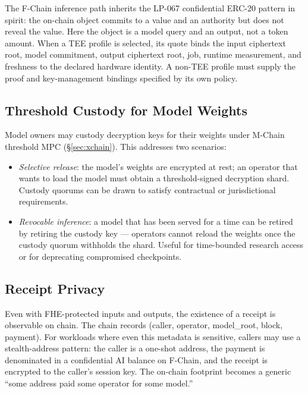 The F-Chain inference path inherits the LP-067 confidential ERC-20
pattern in spirit: the on-chain object commits to a value and an
authority but does not reveal the value. Here the object is a model
query and an output, not a token amount. When a TEE profile is selected, its
quote binds the input ciphertext root, model commitment, output ciphertext root,
job, runtime measurement, and freshness to the declared hardware identity. A
non-TEE profile must supply the proof and key-management bindings specified by
its own policy.

\subsection{Threshold Custody for Model Weights}

Model owners may custody decryption keys for their weights under M-Chain
threshold MPC (\S\ref{sec:xchain}). This addresses two scenarios:

\begin{itemize}[leftmargin=1.2em]
  \item \emph{Selective release}: the model's weights are encrypted at
        rest; an operator that wants to load the model must obtain a
        threshold-signed decryption shard. Custody quorums can be drawn
        to satisfy contractual or jurisdictional requirements.
  \item \emph{Revocable inference}: a model that has been served for a
        time can be retired by retiring the custody key — operators
        cannot reload the weights once the custody quorum withholds the
        shard. Useful for time-bounded research access or for
        deprecating compromised checkpoints.
\end{itemize}

\subsection{Receipt Privacy}

Even with FHE-protected inputs and outputs, the existence of a receipt
is observable on chain. The chain records (caller, operator,
model\_root, block, payment). For workloads where even this metadata
is sensitive, callers may use a stealth-address pattern: the caller is
a one-shot address, the payment is denominated in a confidential AI
balance on F-Chain, and the receipt is encrypted to the caller's
session key. The on-chain footprint becomes a generic ``some address
paid some operator for some model.''

